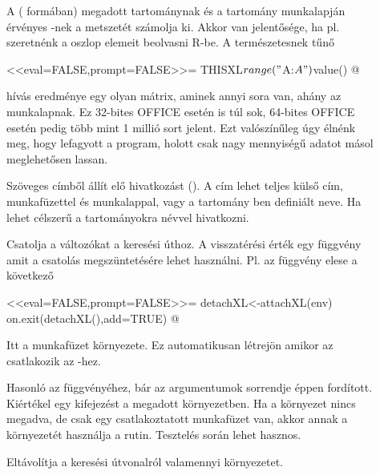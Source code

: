 \begin{description}
\item[] A ( formában)
  megadott tartománynak és a tartomány munkalapján érvényes
  -nek a metszetét számolja ki. 
  Akkor van jelentősége, ha pl. szeretnénk a 
  oszlop elemeit beolvasni R-be. A természetesnek tűnő
  \begin{Rnw}
<<eval=FALSE,prompt=FALSE>>=
THISXL$range("$A:$A")$value()  
@ 
  \end{Rnw}
  hívás eredménye egy olyan mátrix, aminek annyi sora van, ahány az
   munkalapnak. Ez 32-bites OFFICE esetén is túl sok, 64-bites
  OFFICE esetén pedig több mint 1 millió sort jelent. Ezt valószínűleg
  úgy élnénk meg, hogy lefagyott a program, holott  csak nagy
  mennyiségű adatot másol meglehetősen lassan. 
\item[] Szöveges címből állít elő hivatkozást
  (). A cím lehet teljes külső cím, munkafüzettel és
  munkalappal, vagy a tartomány ben definiált neve. Ha
  lehet célszerű a tartományokra névvel hivatkozni. 
\item[] Csatolja a 
  változókat a keresési úthoz. A visszatérési érték egy függvény amit
  a csatolás megszüntetésére lehet használni. Pl. az 
  függvény elese a következő
  \begin{Rnw}
<<eval=FALSE,prompt=FALSE>>=
detachXL<-attachXL(env)
on.exit(detachXL(),add=TRUE)
@     
  \end{Rnw}
  Itt  a munkafüzet  környezete. Ez automatikusan
  létrejön amikor az  csatlakozik az -hez.

\item[] Hasonló az   függvényéhez,
    bár az argumentumok sorrendje éppen fordított. Kiértékel egy
     kifejezést a megadott környezetben. Ha a környezet nincs
    megadva, de csak egy csatlakoztatott munkafüzet van, akkor annak a
    környezetét használja a rutin. Tesztelés során lehet hasznos.

\item[] Eltávolítja a keresési útvonalról
  valamennyi  környezetet. 


\end{description}
